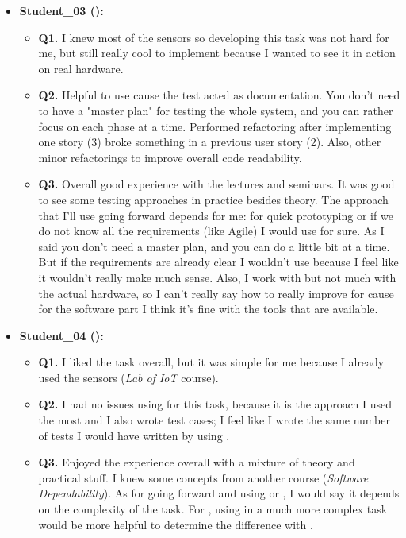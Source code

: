 \begin{itemize}
    \item \textbf{Student\_03 (\tdd):}
    \begin{itemize}
        \item \textbf{Q1.} I knew most of the sensors so developing this task was not hard for me, but still really cool to implement because I wanted to see it in action on real hardware.
        \item \textbf{Q2.} Helpful to use \tdd cause the test acted as documentation. You don't need to have a "master plan" for testing the whole system, and you can rather focus on each phase at a time. Performed refactoring after implementing one story (3) broke something in a previous user story (2). Also, other minor refactorings to improve overall code readability.
        \item \textbf{Q3.} Overall good experience with the lectures and seminars. It was good to see some testing approaches in practice besides theory. The approach that I'll use going forward depends for me: for quick prototyping or if we do not know all the requirements (like Agile) I would use \tdd for sure. As I said you don't need a master plan, and you can do a little bit at a time. But if the requirements are already clear I wouldn't use \tdd because I feel like it wouldn't really make much sense. Also, I work with \ess but not much with the actual hardware, so I can't really say how to really improve \tdd for \ess cause for the software part I think it's fine with the tools that are available.
    \end{itemize}

    \item \textbf{Student\_04 (\tdd):}
    \begin{itemize}
        \item \textbf{Q1.} I liked the task overall, but it was simple for me because I already used the sensors (\textit{Lab of IoT} course). 
        \item \textbf{Q2.} I had no issues using \notdd for this task, because it is the approach I used the most and I also wrote test cases; I feel like I wrote the same number of tests I would have written by using \tdd.
        \item \textbf{Q3.} Enjoyed the experience overall with a mixture of theory and practical stuff. I knew some \tdd concepts from another course (\textit{Software Dependability}). As for \ess going forward and using \tdd or \notdd, I would say it depends on the complexity of the task. For \ess, using \tdd in a much more complex task would be more helpful to determine the difference with \notdd. 
    \end{itemize}


\end{itemize}
